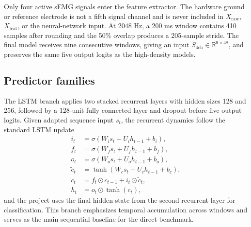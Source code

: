 Only four active sEMG signals enter the feature extractor. The hardware ground or reference electrode is not a fifth signal channel and is never included in $X_{\mathrm{raw}}$, $X_{\mathrm{feat}}$, or the neural-network input. At 2048 Hz, a 200 ms window contains 410 samples after rounding and the 50\% overlap produces a 205-sample stride. The final model receives nine consecutive windows, giving an input $S_{4\mathrm{ch}}\in\mathbb{R}^{9\times48}$, and preserves the same five output logits as the high-density models.

\subsection{Predictor families}

The LSTM branch applies two stacked recurrent layers with hidden sizes 128 and 256, followed by a 128-unit fully connected layer and dropout before five output logits. Given adapted sequence input $s_t$, the recurrent dynamics follow the standard LSTM update
\[
\begin{aligned}
i_t &= \sigma(W_i s_t + U_i h_{t-1} + b_i), \\
f_t &= \sigma(W_f s_t + U_f h_{t-1} + b_f), \\
o_t &= \sigma(W_o s_t + U_o h_{t-1} + b_o), \\
\tilde{c}_t &= \tanh(W_c s_t + U_c h_{t-1} + b_c), \\
c_t &= f_t \odot c_{t-1} + i_t \odot \tilde{c}_t, \\
h_t &= o_t \odot \tanh(c_t),
\end{aligned}
\]
and the project uses the final hidden state from the second recurrent layer for classification. This branch emphasizes temporal accumulation across windows and serves as the main sequential baseline for the direct benchmark.

